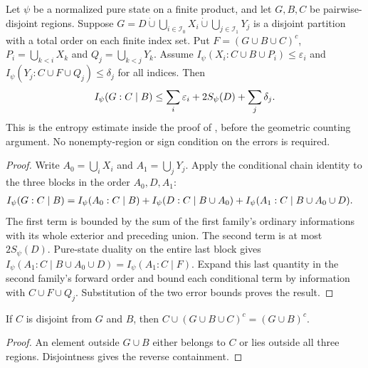 \begin{theorem}
    \label{thm:finite_product_conditional_two_family_bound}
    \leanok
    Let $\psi$ be a normalized pure state on a finite product, and let
    $G,B,C$ be pairwise-disjoint regions. Suppose
    $G=D\mathbin{\dot\cup}\bigcup_{i\in\mathcal I_0}X_i
       \mathbin{\dot\cup}\bigcup_{j\in\mathcal I_1}Y_j$
    is a disjoint partition with a total order on each finite index set.
    Put $F=(G\cup B\cup C)^c$, $P_i=\bigcup_{k<i}X_k$ and
    $Q_j=\bigcup_{k<j}Y_k$. Assume
    $I_\psi(X_i:C\cup B\cup P_i)\le\varepsilon_i$ and
    $I_\psi(Y_j:C\cup F\cup Q_j)\le\delta_j$ for all indices.
    Then
    \begin{align}
        I_\psi(G:C\mid B)
        \le \sum_i\varepsilon_i+2S_\psi(D)+\sum_j\delta_j.
        \notag
    \end{align}
    This is the entropy estimate inside the proof of
    \cite[Lemma~3.2]{OpenAI2026PolynomialPEPS}, before the geometric counting
    argument. No nonempty-region or sign condition on the errors is required.
\end{theorem}
\begin{proof}\leanok
    Write $A_0=\bigcup_iX_i$ and $A_1=\bigcup_jY_j$. Apply the conditional
    chain identity to the three blocks in the order $A_0,D,A_1$:
    \begin{align}
        I_\psi(G:C\mid B)
        &=I_\psi(A_0:C\mid B)
          +I_\psi(D:C\mid B\cup A_0)
          +I_\psi(A_1:C\mid B\cup A_0\cup D).
        \notag
    \end{align}
    The first term is bounded by the sum of the first family's ordinary
    informations with its whole exterior and preceding union. The second
    term is at most $2S_\psi(D)$. Pure-state duality on the entire last block
    gives $I_\psi(A_1:C\mid B\cup A_0\cup D)=I_\psi(A_1:C\mid F)$.
    Expand this last quantity in the second family's forward order and bound
    each conditional term by information with $C\cup F\cup Q_j$.
    Substitution of the two error bounds proves the result.
\end{proof}

\begin{theorem}
    \label{thm:finite_product_conditional_source_exterior}
    \leanok
    If $C$ is disjoint from $G$ and $B$, then
    $C\cup(G\cup B\cup C)^c=(G\cup B)^c$.
\end{theorem}
\begin{proof}\leanok
    An element outside $G\cup B$ either belongs to $C$ or lies outside all
    three regions. Disjointness gives the reverse containment.
\end{proof}
